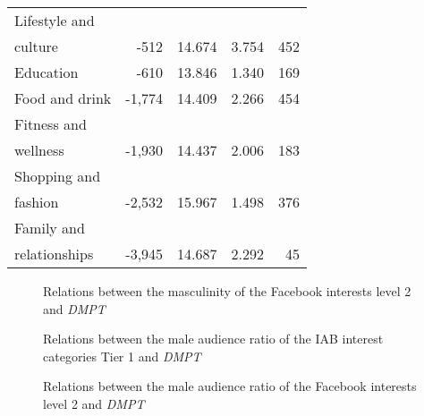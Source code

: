 \documentclass[twocolumn]{bmcart}\usepackage{lineno}
\begin{document}
\begin{backmatter}
\begin{center}
\begin{table}[!t]
\begin{tabular}{|l|rrrr|}
      Lifestyle and &        &   &              &         \\
      culture &       -512 &  14.674 &             3.754 &         452 \\
                  Education &       -610 &  13.846 &             1.340 &         169 \\
             Food and drink &     -1,774 &  14.409 &             2.266 &         454 \\
       Fitness and &     &   &              &          \\
       wellness &     -1,930 &  14.437 &             2.006 &         183 \\
       Shopping and &      &  &              &         \\
        fashion &     -2,532 &  15.967 &             1.498 &         376 \\
   Family and &      &   &              &           \\
   relationships &     -3,945 &  14.687 &             2.292 &          45 \\

\hline
\end{tabular}
     \end{table}
\end{center}
 
\begin{figure}
\color{blue}
    \centering
\caption{Relations between the masculinity of the Facebook interests level 2 and \emph{DMPT}}
    \label{fig:mascFbReg}
\end{figure}
\color{black}


\begin{figure}
\color{blue}
    \centering
\caption{Relations between the male audience ratio of the IAB interest categories Tier 1 and \emph{DMPT}}
    \label{fig:maleRatioIabReg}
\color{black}
\end{figure}

\begin{figure}
\color{blue}
    \centering
\caption{Relations between the male audience ratio of the Facebook interests level 2 and \emph{DMPT}}
    \label{fig:maleRatioFbReg}
\color{black}
\end{figure}




\end{backmatter}
\end{document}
